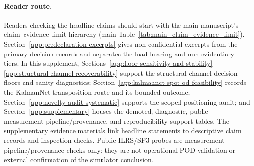 \documentclass{article}
\begin{document}
\paragraph{Reader route.}
Readers checking the headline claims should start with the main manuscript's claim--evidence--limit hierarchy (main Table~\ref{tab:main_claim_evidence_limit}). Section~\ref{app:predeclaration-excerpts} gives non-confidential excerpts from the primary decision records and separates the load-bearing and non-evidentiary tiers. In this supplement, Sections~\ref{app:floor-sensitivity-and-stability}--\ref{app:structural-channel-recoverability} support the structural-channel decision floors and sanity diagnostics; Section~\ref{app:kalmannet-spot-od-feasibility} records the KalmanNet transposition route and its bounded outcome; Section~\ref{app:novelty-audit-systematic} supports the scoped positioning audit; and Section~\ref{app:supplementary} houses the demoted, diagnostic, public measurement-pipeline/provenance, and reproducibility-support tables. The supplementary evidence materials link headline statements to descriptive claim records and inspection checks. Public ILRS/SP3 probes are measurement-pipeline/provenance checks only; they are not operational POD validation or external confirmation of the simulator conclusion.
\end{document}
